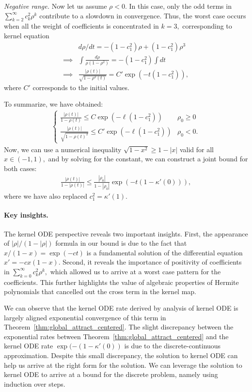 \documentclass[twoside]{article}
\theoremstyle{definition}
\begin{document}
\textit{Negative range.}
Now let us assume $\rho<0.$ In this case, only the odd terms in $\sum_{k=2}^\infty c_k^2 \rho^k$ contribute to a slowdown in convergence. Thus, the worst case occurs when all the weight of coefficients is concentrated in $k=3,$ corresponding to kernel equation 
\begin{align*}
&d\rho/dt = -(1-c_1^2)\rho + (1-c_1^2) \rho^3\\
\implies    &\int \frac{d\rho}{\rho(1-\rho^2)} = -(1-c_1^2)\int dt \\
\implies &\frac{|\rho(t)|}{\sqrt{1-\rho^2(t)}} = C' \exp(-t(1-c_1^2)),
\end{align*}
where $C'$ corresponds to the initial values. 

To summarize, we have obtained:
\begin{align*}
    \begin{cases}
        \frac{|\rho(t)|}{1-\rho(t)} \le C \exp(-\ell(1-c_1^2)) & \rho_0 \ge 0\\
        \frac{|\rho(t)|}{\sqrt{1-\rho(t)^2}}\le C' \exp(-\ell(1-c_1^2)) & \rho_0 < 0.
    \end{cases}
\end{align*}
Now, we can use a numerical inequality $\sqrt{1-x^2} \ge 1-|x|$ valid for all $x\in(-1,1),$ and by solving for the constant, we can construct a joint bound for both cases:
\begin{align*}
    \frac{|\rho(t)|}{1-|\rho(t)|} \le \frac{|\rho_0|}{1-|\rho_0|} \exp(-t (1-\kappa'(0))), 
\end{align*}
where we have also replaced $c_1^2=\kappa'(1).$  

\paragraph{Key insights.}
The kernel ODE perspective reveals two important insights. 
First, the appearance of $|\rho|/(1-|\rho|)$ formula in our bound is due to the fact that $x/(1-x) = \exp( -c t) $ is a fundamental solution of the differential equation $x' = - c x(1-x).$ Second, it reveals the importance of positivity of coefficients in $\sum_{k=0}^\infty c_k^2\rho^k,$ which allowed us to arrive at a worst case pattern for the coefficients. This further highlights the value of algebraic properties of Hermite polynomials that cancelled out the cross term in the kernel map. 

We can observe that the kernel ODE rate derived by analysis of kernel ODE is largely aligned exponential convergence of this term in Theorem~\ref{thm:global_attract_centered}. The slight discrepancy between the exponential rates between Theorem~\ref{thm:global_attract_centered} and the kernel ODE rate $\exp(-(1-\kappa'(0))$ is due to the discrete-continuous approximation. Despite this small discrepancy, the solution to kernel ODE can help us arrive at the right form for the solution. We can leverage the solution to kernel ODE to arrive at a bound for the discrete problem, namely using induction over steps.
\end{document}
